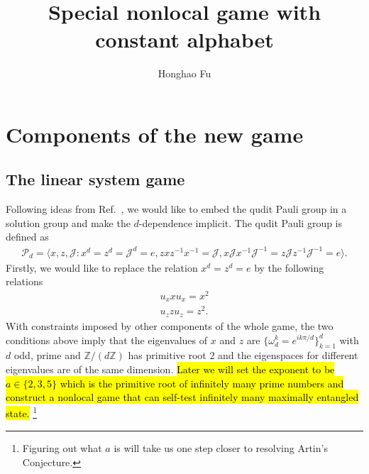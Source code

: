 \documentclass[11pt,letterpaper]{article}
\newcommand{\Z}{\mathbb{Z}}
\newcommand{\1}{\mathbb{1}}
\newcommand{\Pg}{\mathcal{P}}
\newcommand{\J}{\mathcal{J}}
\theoremstyle{definition}
\begin{document}
\title{Special nonlocal game with constant alphabet}

\author[1]{Honghao Fu}


\renewcommand\Affilfont{\itshape\small}


\maketitle

\section{Components of the new game}
\label{sec:comp}
\subsection{The linear system game}
Following ideas from Ref.~\cite{coladan2017}, we would like to embed the qudit Pauli group in a solution group and
make the $d$-dependence implicit. The qudit Pauli group is defined as
\begin{align}
	\Pg_d = \langle x, z, \J : x^d = z^d = \J^d = e, zxz^{-1}x^{-1} = \J, x\J x^{-1}\J^{-1}= z\J z^{-1}\J^{-1} = e\rangle. 
\end{align}
Firstly, we would like to replace the relation $x^d = z^d = e$ by the following relations
\begin{align}
\label{eq:sim}
	u_x x u_x = x^2 \\
	u_z z u_z = z^2.
\end{align}
With constraints imposed by other components of the whole game, the two conditions above 
imply that the eigenvalues of $x$ and $z$ are $\{\omega_d^k = e^{ik\pi/d}\}_{k=1}^d$ with $d$ odd, prime and
$\Z/(d\Z)$ has primitive root $2$ and the eigenspaces for different eigenvalues are of the same dimension.
\hl{Later we will set the exponent to be $a \in \{2, 3, 5\}$ which is the primitive root of infinitely many prime numbers and
construct a nonlocal game that can self-test infinitely many maximally entangled state.}
\footnote{Figuring out what $a$ is will take us one step closer to resolving Artin's Conjecture\cite{murty1988}.}
\end{document}
